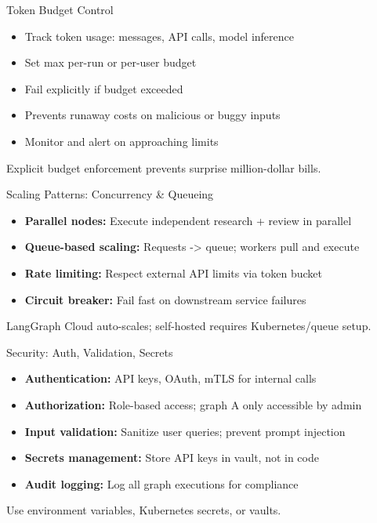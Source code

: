 \documentclass[aspectratio=169,11pt]{beamer}
\begin{document}
\begin{frame}{Token Budget Control}
\setlength{\itemsep}{1pt}
\begin{itemize}
\item Track token usage: messages, API calls, model inference
\item Set max per-run or per-user budget
\item Fail explicitly if budget exceeded
\item Prevents runaway costs on malicious or buggy inputs
\item Monitor and alert on approaching limits
\end{itemize}
\vspace{0.1cm}
\begin{warningbox}
Explicit budget enforcement prevents surprise million-dollar bills.
\end{warningbox}
\end{frame}

\begin{frame}{Scaling Patterns: Concurrency \& Queueing}
\setlength{\itemsep}{1pt}
\begin{itemize}
\item \textbf{Parallel nodes:} Execute independent research + review in parallel
\item \textbf{Queue-based scaling:} Requests -> queue; workers pull and execute
\item \textbf{Rate limiting:} Respect external API limits via token bucket
\item \textbf{Circuit breaker:} Fail fast on downstream service failures
\end{itemize}
\vspace{0.15cm}
\begin{conceptbox}
LangGraph Cloud auto-scales; self-hosted requires Kubernetes/queue setup.
\end{conceptbox}
\end{frame}

\begin{frame}{Security: Auth, Validation, Secrets}
\setlength{\itemsep}{1pt}
\begin{itemize}
\item \textbf{Authentication:} API keys, OAuth, mTLS for internal calls
\item \textbf{Authorization:} Role-based access; graph A only accessible by admin
\item \textbf{Input validation:} Sanitize user queries; prevent prompt injection
\item \textbf{Secrets management:} Store API keys in vault, not in code
\item \textbf{Audit logging:} Log all graph executions for compliance
\end{itemize}
\vspace{0.15cm}
\begin{warningbox}
Use environment variables, Kubernetes secrets, or vaults.
\end{warningbox}
\end{frame}
\end{document}
